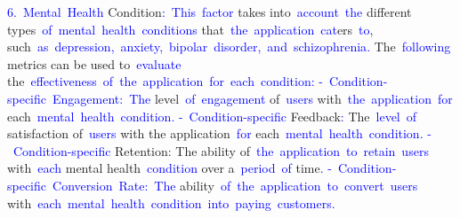 \documentclass{article}
\begin{document}
\begin{tcolorbox}[colframe=black,colback=white]
{}\textcolor{blue}{6}\textcolor{blue}{.}\textcolor{blue}{~Mental}\textcolor{blue}{~Health} Condition\textcolor{blue}{:}\textcolor{blue}{~This}\textcolor{blue}{~factor} takes into\textcolor{blue}{~account}\textcolor{blue}{~the} different types\textcolor{blue}{~of}\textcolor{blue}{~mental}\textcolor{blue}{~health}\textcolor{blue}{~conditions} that\textcolor{blue}{~the}\textcolor{blue}{~application}\textcolor{blue}{~cat}ers\textcolor{blue}{~to}, such\textcolor{blue}{~as}\textcolor{blue}{~depression}\textcolor{blue}{,}\textcolor{blue}{~anxiety}\textcolor{blue}{,}\textcolor{blue}{~bipolar}\textcolor{blue}{~disorder}\textcolor{blue}{,}\textcolor{blue}{~and}\textcolor{blue}{~schizophrenia}\textcolor{blue}{.} The\textcolor{blue}{~following} metrics can be used to\textcolor{blue}{~evaluate} the\textcolor{blue}{~effectiveness}\textcolor{blue}{~of}\textcolor{blue}{~the}\textcolor{blue}{~application}\textcolor{blue}{~for}\textcolor{blue}{~each}\textcolor{blue}{~condition}\textcolor{blue}{:
}\textcolor{blue}{-}\textcolor{blue}{~Condition}\textcolor{blue}{-specific}\textcolor{blue}{~Engagement}\textcolor{blue}{:}\textcolor{blue}{~The} level\textcolor{blue}{~of}\textcolor{blue}{~engagement} of\textcolor{blue}{~users} with\textcolor{blue}{~the}\textcolor{blue}{~application}\textcolor{blue}{~for} each\textcolor{blue}{~mental}\textcolor{blue}{~health}\textcolor{blue}{~condition}\textcolor{blue}{.
}\textcolor{blue}{-}\textcolor{blue}{~Condition}\textcolor{blue}{-specific} Feedback\textcolor{blue}{:} The\textcolor{blue}{~level}\textcolor{blue}{~of} satisfaction of\textcolor{blue}{~users} with the application\textcolor{blue}{~for} each\textcolor{blue}{~mental}\textcolor{blue}{~health}\textcolor{blue}{~condition}\textcolor{blue}{.
}\textcolor{blue}{-}\textcolor{blue}{~Condition}\textcolor{blue}{-specific} Retention: The ability of\textcolor{blue}{~the}\textcolor{blue}{~application}\textcolor{blue}{~to}\textcolor{blue}{~retain}\textcolor{blue}{~users} with\textcolor{blue}{~each} mental health\textcolor{blue}{~condition} over a\textcolor{blue}{~period}\textcolor{blue}{~of} time\textcolor{blue}{.
}\textcolor{blue}{-}\textcolor{blue}{~Condition}\textcolor{blue}{-specific}\textcolor{blue}{~Conversion}\textcolor{blue}{~Rate}\textcolor{blue}{:}\textcolor{blue}{~The} ability\textcolor{blue}{~of}\textcolor{blue}{~the}\textcolor{blue}{~application}\textcolor{blue}{~to}\textcolor{blue}{~convert}\textcolor{blue}{~users} with\textcolor{blue}{~each}\textcolor{blue}{~mental}\textcolor{blue}{~health}\textcolor{blue}{~condition}\textcolor{blue}{~into}\textcolor{blue}{~paying}\textcolor{blue}{~customers}\textcolor{blue}{.
}
\end{tcolorbox}
\end{document}
